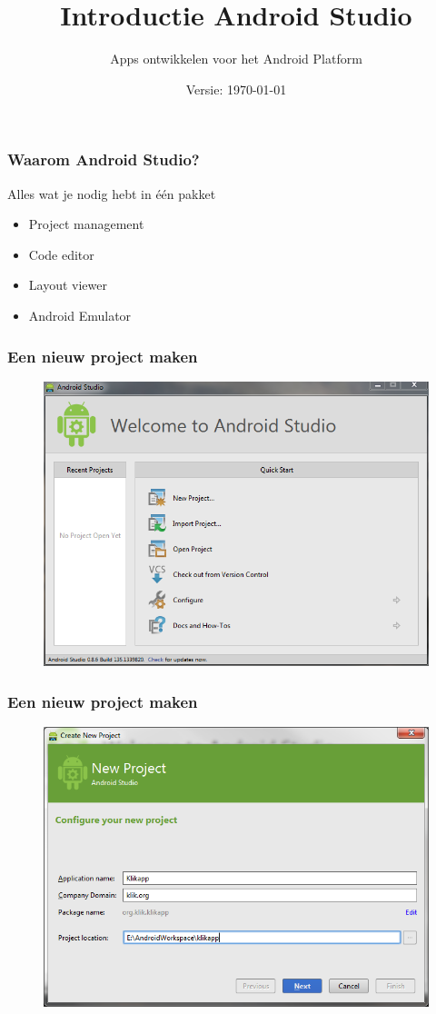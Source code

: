 \documentclass[11pt]{beamer}
\title{Introductie Android Studio}
\subtitle{Apps ontwikkelen voor het Android Platform}
\date{Versie: \today}
\begin{document}
\maketitle

\begin{frame}
\frametitle{Waarom Android Studio?}
Alles wat je nodig hebt in \'e\'en pakket
\begin{itemize}
\item Project management
\item Code editor
\item Layout viewer
\item Android Emulator
\end{itemize}
\end{frame}

\begin{frame}
\frametitle{Een nieuw project maken}
\begin{figure}
\centering
\includegraphics[height=.9\textheight]{./newproject1}
\label{fig:newproject1}
\end{figure}
\end{frame}

\begin{frame}
\frametitle{Een nieuw project maken}
\begin{figure}
\centering
\includegraphics[height=.9\textheight]{./newproject2}
\label{fig:newproject2}
\end{figure}
\end{frame}
\end{document}
